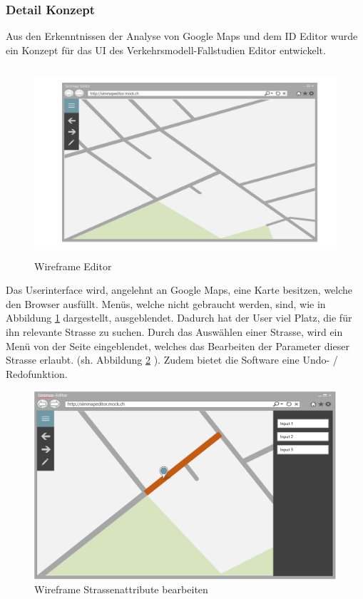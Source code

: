 \subsubsection{Detail Konzept}\label{sec:detailuiconcept}
Aus den Erkenntnissen der Analyse von Google Maps und dem ID Editor wurde ein Konzept für das UI des Verkehrsmodell-Fallstudien Editor entwickelt.
\begin{figure}[H]
\centering
\includegraphics[height=7cm]{images/KonzeptUI.png}
\caption{Wireframe Editor}
\label{fig:conceptui}
\end{figure}
\noindent
Das Userinterface wird, angelehnt an Google Maps, eine Karte besitzen, welche den Browser ausfüllt. Menüs, welche nicht gebraucht werden, sind, wie in Abbildung \ref{fig:conceptui}  dargestellt, ausgeblendet. Dadurch hat der User viel Platz, die für ihn relevante Strasse zu suchen. Durch das Auswählen einer Strasse, wird ein Menü von der Seite eingeblendet, welches das Bearbeiten der Parameter dieser Strasse erlaubt. (sh. Abbildung \ref{fig:concepteditStreet} ). Zudem bietet die Software eine Undo- / Redofunktion.
\begin{figure}[H]
\centering
\includegraphics[height=7cm]{images/KonzeptEditStreet.png}
\caption{Wireframe Strassenattribute bearbeiten}
\label{fig:concepteditStreet}
\end{figure}
